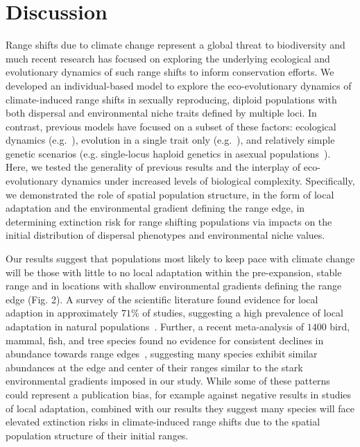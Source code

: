 \documentclass[11pt]{article}
\begin{document}
\section*{Discussion}
Range shifts due to climate change represent a global threat to biodiversity and much recent research has focused on exploring the underlying ecological and evolutionary dynamics of such range shifts to inform conservation efforts. We developed an individual-based model to explore the eco-evolutionary dynamics of climate-induced range shifts in sexually reproducing, diploid populations with both dispersal and environmental niche traits defined by multiple loci. In contrast, previous models have focused on a subset of these factors: ecological dynamics (e.g.~\citep{brooker2007modelling}), evolution in a single trait only (e.g.~\citep{atkins2010local, henry2013eco}), and relatively simple genetic scenarios (e.g. single-locus haploid genetics in asexual populations~\citep{boeye2013more, hargreaves2015fitness}).  Here, we tested the generality of previous results and the interplay of eco-evolutionary dynamics under increased levels of biological complexity. Specifically, we demonstrated the role of spatial population structure, in the form of local adaptation and the environmental gradient defining the range edge, in determining extinction risk for range shifting populations via impacts on the initial distribution of dispersal phenotypes and environmental niche values.

Our results suggest that populations most likely to keep pace with climate change will be those with little to no local adaptation within the pre-expansion, stable range and in locations with shallow environmental gradients defining the range edge (Fig. 2). A survey of the scientific literature found evidence for local adaption in approximately $71\%$ of studies, suggesting a high prevalence of local adaptation in natural populations~\citep{hereford2009quantitative}. Further, a recent meta-analysis of $1400$ bird, mammal, fish, and tree species found no evidence for consistent declines in abundance towards range edges~\citep{dallas2017species}, suggesting many species exhibit similar abundances at the edge and center of their ranges similar to the stark environmental gradients imposed in our study. While some of these patterns could represent a publication bias, for example against negative results in studies of local adaptation, combined with our results they suggest many species will face elevated extinction risks in climate-induced range shifts due to the spatial population structure of their initial ranges.
\end{document}
